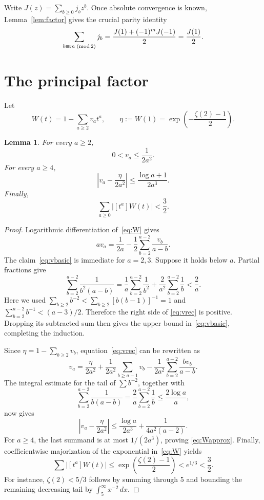 \documentclass[11pt]{amsart}
\newtheorem{lemma}[theorem]{Lemma}
\theoremstyle{remark}
\begin{document}
Write \(J(z)=\sum_{b\ge0}j_bz^b\). Once absolute convergence is known,
Lemma~\ref{lem:factor} gives the crucial parity identity
\begin{equation}\label{eq:parity}
 \sum_{b\equiv m\;({\rm mod}\,2)}j_b
 =\frac{J(1)+(-1)^mJ(-1)}2=\frac{J(1)}2.
\end{equation}

\section{The principal factor}\label{sec:W}

Let
\[
 W(t)=1-\sum_{a\ge2}v_at^a,
 \qquad
 \eta:=W(1)=\exp\!\left(-\frac{\zeta(2)-1}{2}\right).
\]

\begin{lemma}\label{lem:Wsign}
For every \(a\ge2\),
\begin{equation}\label{eq:vbasic}
 0<v_a\le\frac1{2a^2}.
\end{equation}
For every \(a\ge4\),
\begin{equation}\label{eq:Wapprox}
 \left|v_a-\frac{\eta}{2a^2}\right|
 \le\frac{\log a+1}{2a^3}.
\end{equation}
Finally,
\begin{equation}\label{eq:Wnorm}
 \sum_{a\ge0}|[t^a]W(t)|<\frac32.
\end{equation}
\end{lemma}

\begin{proof}
Logarithmic differentiation of~\eqref{eq:W} gives
\begin{equation}\label{eq:vrec}
 a v_a=\frac1{2a}-\frac12\sum_{b=2}^{a-2}\frac{v_b}{a-b}.
\end{equation}
The claim~\eqref{eq:vbasic} is immediate for \(a=2,3\). Suppose it holds
below \(a\). Partial fractions give
\[
 \sum_{b=2}^{a-2}\frac1{b^2(a-b)}
 =\frac1a\sum_{b=2}^{a-2}\frac1{b^2}
  +\frac2{a^2}\sum_{b=2}^{a-2}\frac1b<\frac2a.
\]
Here we used
\(\sum_{b\ge2}b^{-2}<\sum_{b\ge2}[b(b-1)]^{-1}=1\) and
\(\sum_{b=2}^{a-2}b^{-1}<(a-3)/2\). Therefore the right side of
\eqref{eq:vrec} is positive. Dropping its subtracted sum then gives the
upper bound in~\eqref{eq:vbasic}, completing the induction.

Since \(\eta=1-\sum_{b\ge2}v_b\), equation~\eqref{eq:vrec} can be rewritten
as
\[
 v_a=\frac{\eta}{2a^2}
 +\frac1{2a^2}\sum_{b\ge a-1}v_b
 -\frac1{2a^2}\sum_{b=2}^{a-2}\frac{bv_b}{a-b}.
\]
The integral estimate for the tail of \(\sum b^{-2}\), together with
\[
 \sum_{b=2}^{a-2}\frac1{b(a-b)}
 =\frac2a\sum_{b=2}^{a-2}\frac1b\le\frac{2\log a}{a},
\]
now gives
\[
 \left|v_a-\frac{\eta}{2a^2}\right|
 \le\frac{\log a}{2a^3}+\frac1{4a^2(a-2)}.
\]
For \(a\ge4\), the last summand is at most \(1/(2a^3)\), proving
\eqref{eq:Wapprox}. Finally, coefficientwise majorization of the exponential
in~\eqref{eq:W} yields
\[
 \sum|[t^a]W(t)|
 \le\exp\!\left(\frac{\zeta(2)-1}{2}\right)<e^{1/3}<\frac32.
\]
For instance, \(\zeta(2)<5/3\) follows by summing through 5 and bounding the
remaining decreasing tail by \(\int_5^\infty x^{-2}\,dx\).
\end{proof}
\end{document}
